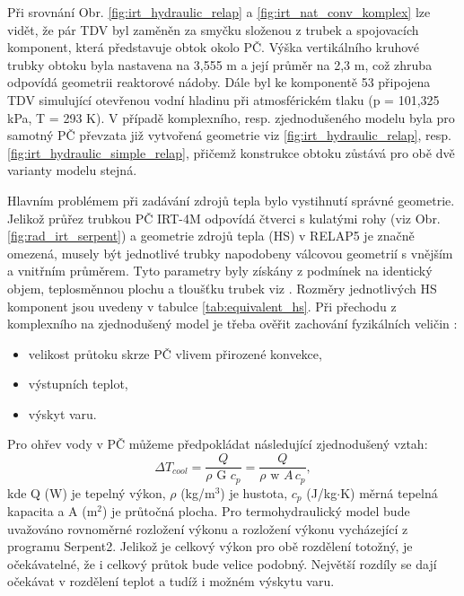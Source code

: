Při srovnání Obr. \ref{fig:irt_hydraulic_relap} a \ref{fig:irt_nat_conv_komplex} lze vidět, že pár TDV byl zaměněn za smyčku složenou z trubek a spojovacích komponent, která představuje obtok okolo PČ. Výška vertikálního kruhové trubky obtoku byla nastavena na 3,555 m a její průměr na 2,3 m, což zhruba odpovídá geometrii reaktorové nádoby. Dále byl ke komponentě 53 připojena TDV simulující otevřenou vodní hladinu při atmosférickém tlaku (p = 101,325 kPa, T = 293 K). V případě komplexního, resp. zjednodušeného modelu byla pro samotný PČ převzata již vytvořená geometrie viz \ref{fig:irt_hydraulic_relap}, resp. \ref{fig:irt_hydraulic_simple_relap}, přičemž konstrukce obtoku zůstává pro obě dvě varianty modelu stejná.

Hlavním problémem při zadávání zdrojů tepla bylo vystihnutí správné geometrie. Jelikož průřez trubkou PČ IRT-4M odpovídá čtverci s kulatými rohy (viz Obr. \ref{fig:rad_irt_serpent}) a geometrie zdrojů tepla (HS) v RELAP5 je značně omezená, musely být jednotlivé trubky napodobeny válcovou geometrií s vnějším a vnitřním průměrem. Tyto parametry byly získány z podmínek na identický objem, teplosměnnou plochu a tloušťku trubek viz \cite{fejt}. Rozměry jednotlivých HS komponent jsou uvedeny v tabulce \ref{tab:equivalent_hs}. Při přechodu z komplexního na zjednodušený model je třeba ověřit zachování fyzikálních veličin \cite{fejt}: 
\begin{itemize}
	\item velikost průtoku skrze PČ vlivem přirozené konvekce,
	\item výstupních teplot,
	\item výskyt varu.
\end{itemize}
Pro ohřev vody v PČ můžeme předpokládat následující zjednodušený vztah:
\begin{equation}
	\Delta T_{cool} = \frac{Q}{\rho \text{ G } c_p } = \frac{Q}{\rho \text{ w } A \,c_p },
\end{equation}
kde Q (W) je tepelný výkon, $\rho$ (kg/m$^3$) je hustota, $c_p$ (J/kg$\cdot$K) měrná tepelná kapacita a A (m$^2$) je průtočná plocha. Pro termohydraulický model bude uvažováno rovnoměrné rozložení výkonu  a rozložení výkonu vycházející z programu Serpent2. Jelikož je celkový výkon pro obě rozdělení totožný, je očekávatelné, že i celkový průtok bude velice podobný. Největší rozdíly se dají očekávat v rozdělení teplot a tudíž i možném výskytu varu.

